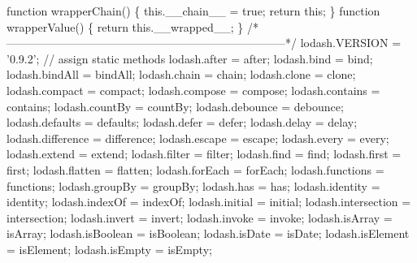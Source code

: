 \begin{DoxyCodeInclude}
{{\textcolor{stringliteral}{  function wrapperChain() \{}
\textcolor{stringliteral}{    this.\_\_chain\_\_ = true;}
\textcolor{stringliteral}{    return this;}
\textcolor{stringliteral}{  \}}
\textcolor{stringliteral}{}
\textcolor{stringliteral}{  function wrapperValue() \{}
\textcolor{stringliteral}{    return this.\_\_wrapped\_\_;}
\textcolor{stringliteral}{  \}}
\textcolor{stringliteral}{}
\textcolor{stringliteral}{  /*--------------------------------------------------------------------------*/}
\textcolor{stringliteral}{}
\textcolor{stringliteral}{  lodash.VERSION = '0.9.2';}
\textcolor{stringliteral}{}
\textcolor{stringliteral}{  // assign static methods}
\textcolor{stringliteral}{  lodash.after = after;}
\textcolor{stringliteral}{  lodash.bind = bind;}
\textcolor{stringliteral}{  lodash.bindAll = bindAll;}
\textcolor{stringliteral}{  lodash.chain = chain;}
\textcolor{stringliteral}{  lodash.clone = clone;}
\textcolor{stringliteral}{  lodash.compact = compact;}
\textcolor{stringliteral}{  lodash.compose = compose;}
\textcolor{stringliteral}{  lodash.contains = contains;}
\textcolor{stringliteral}{  lodash.countBy = countBy;}
\textcolor{stringliteral}{  lodash.debounce = debounce;}
\textcolor{stringliteral}{  lodash.defaults = defaults;}
\textcolor{stringliteral}{  lodash.defer = defer;}
\textcolor{stringliteral}{  lodash.delay = delay;}
\textcolor{stringliteral}{  lodash.difference = difference;}
\textcolor{stringliteral}{  lodash.escape = escape;}
\textcolor{stringliteral}{  lodash.every = every;}
\textcolor{stringliteral}{  lodash.extend = extend;}
\textcolor{stringliteral}{  lodash.filter = filter;}
\textcolor{stringliteral}{  lodash.find = find;}
\textcolor{stringliteral}{  lodash.first = first;}
\textcolor{stringliteral}{  lodash.flatten = flatten;}
\textcolor{stringliteral}{  lodash.forEach = forEach;}
\textcolor{stringliteral}{  lodash.functions = functions;}
\textcolor{stringliteral}{  lodash.groupBy = groupBy;}
\textcolor{stringliteral}{  lodash.has = has;}
\textcolor{stringliteral}{  lodash.identity = identity;}
\textcolor{stringliteral}{  lodash.indexOf = indexOf;}
\textcolor{stringliteral}{  lodash.initial = initial;}
\textcolor{stringliteral}{  lodash.intersection = intersection;}
\textcolor{stringliteral}{  lodash.invert = invert;}
\textcolor{stringliteral}{  lodash.invoke = invoke;}
\textcolor{stringliteral}{  lodash.isArray = isArray;}
\textcolor{stringliteral}{  lodash.isBoolean = isBoolean;}
\textcolor{stringliteral}{  lodash.isDate = isDate;}
\textcolor{stringliteral}{  lodash.isElement = isElement;}
\textcolor{stringliteral}{  lodash.isEmpty = isEmpty;}
}}
\end{DoxyCodeInclude}
